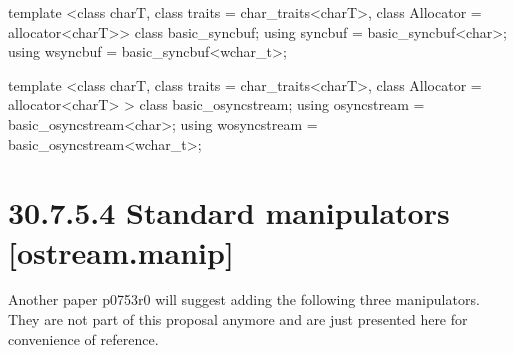 \documentclass[ebook,11pt,article]{memoir}
\begin{document}
\begin{addedblock}
\begin{codeblock}
template <class charT,
          class traits = char_traits<charT>,
          class Allocator = allocator<charT>>
  class basic_syncbuf;
using syncbuf  = basic_syncbuf<char>;
using wsyncbuf = basic_syncbuf<wchar_t>;

template <class charT,
          class traits = char_traits<charT>,
          class Allocator = allocator<charT> >
  class basic_osyncstream;
using osyncstream = basic_osyncstream<char>;
using wosyncstream = basic_osyncstream<wchar_t>; 
\end{codeblock}
\end{addedblock}

\section{30.7.5.4 Standard  manipulators [ostream.manip]}
Another paper p0753r0 will suggest adding the following three manipulators. They are not part of this proposal anymore and are just presented here for convenience of reference.
\end{document}
